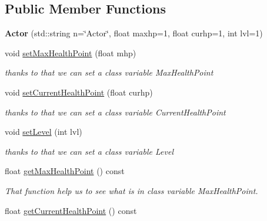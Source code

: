 \subsection*{Public Member Functions}
\begin{DoxyCompactItemize}
\item 
\hypertarget{classActor_aaa8c3a626ddda737270006259be1bfbe}{}{\bfseries Actor} (std\+::string n=\char`\"{}Actor\char`\"{}, float maxhp=1, float curhp=1, int lvl=1)\label{classActor_aaa8c3a626ddda737270006259be1bfbe}

\item 
\hypertarget{classActor_a162b1257ffca028edd0d4db0077cf671}{}void \hyperlink{classActor_a162b1257ffca028edd0d4db0077cf671}{set\+Max\+Health\+Point} (float mhp)\label{classActor_a162b1257ffca028edd0d4db0077cf671}

\begin{DoxyCompactList}\small\item\em thanks to that we can set a class variable Max\+Health\+Point \end{DoxyCompactList}\item 
\hypertarget{classActor_a12e31ce9c3517bd08640d7cc6b1748d8}{}void \hyperlink{classActor_a12e31ce9c3517bd08640d7cc6b1748d8}{set\+Current\+Health\+Point} (float curhp)\label{classActor_a12e31ce9c3517bd08640d7cc6b1748d8}

\begin{DoxyCompactList}\small\item\em thanks to that we can set a class variable Current\+Health\+Point \end{DoxyCompactList}\item 
\hypertarget{classActor_a771a4d2caa4cb8332b18f8bd6f786245}{}void \hyperlink{classActor_a771a4d2caa4cb8332b18f8bd6f786245}{set\+Level} (int lvl)\label{classActor_a771a4d2caa4cb8332b18f8bd6f786245}

\begin{DoxyCompactList}\small\item\em thanks to that we can set a class variable Level \end{DoxyCompactList}\item 
\hypertarget{classActor_ab8df0b5c89a00f84095977cdb34029c7}{}float \hyperlink{classActor_ab8df0b5c89a00f84095977cdb34029c7}{get\+Max\+Health\+Point} () const \label{classActor_ab8df0b5c89a00f84095977cdb34029c7}

\begin{DoxyCompactList}\small\item\em That function help us to see what is in class variable Max\+Health\+Point. \end{DoxyCompactList}\item 
\hypertarget{classActor_a09fbcbbca7b72174ba9fb5af36c3d9f2}{}float \hyperlink{classActor_a09fbcbbca7b72174ba9fb5af36c3d9f2}{get\+Current\+Health\+Point} () const \label{classActor_a09fbcbbca7b72174ba9fb5af36c3d9f2}


\end{DoxyCompactItemize}
